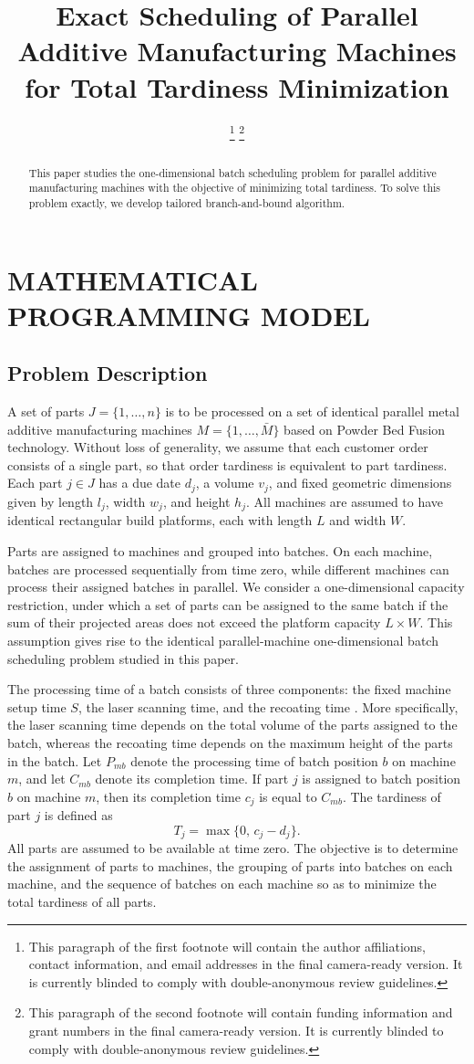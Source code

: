 \documentclass[letterpaper, 10 pt, conference]{ieeeconf}  %
\title{\LARGE \bf
Exact Scheduling of Parallel Additive Manufacturing Machines for Total Tardiness Minimization
}
\author{%
\thanks{This paragraph of the first footnote will contain the author affiliations, contact information, and email addresses in the final camera-ready version. It is currently blinded to comply with double-anonymous review guidelines.}
\thanks{This paragraph of the second footnote will contain funding information and grant numbers in the final camera-ready version. It is currently blinded to comply with double-anonymous review guidelines.}
}
\begin{document}
\maketitle
\thispagestyle{empty}
\pagestyle{empty}

\begin{abstract}
This paper studies the one-dimensional batch scheduling problem for  parallel additive manufacturing machines with the objective of minimizing total tardiness. To solve this problem exactly, we develop tailored branch-and-bound algorithm. 
\end{abstract}



\section{MATHEMATICAL PROGRAMMING MODEL}

\subsection{Problem Description}
A set of parts $J=\{1,\dots,n\}$ is to be processed on a set of identical
parallel metal additive manufacturing machines $M=\{1,\dots,\bar M\}$
based on Powder Bed Fusion technology. Without loss of generality, we assume
that each customer order consists of a single part, so that order tardiness
is equivalent to part tardiness. Each part $j \in J$ has a due date $d_j$, a
volume $v_j$, and fixed geometric dimensions given by length $l_j$, width
$w_j$, and height $h_j$. All machines are assumed to have identical
rectangular build platforms, each with length $L$ and width $W$.

Parts are assigned to machines and grouped into batches. On each machine,
batches are processed sequentially from time zero, while different machines
can process their assigned batches in parallel. We consider a
one-dimensional capacity restriction, under which a set of parts can be
assigned to the same batch if the sum of their projected areas does not
exceed the platform capacity $L \times W$. This assumption gives rise to the
identical parallel-machine one-dimensional batch scheduling problem studied
in this paper.

The processing time of a batch consists of three components: the fixed
machine setup time $S$, the laser scanning time, and the recoating time
\cite{cheMachineSchedulingOrientation2021}. More specifically, the laser
scanning time depends on the total volume of the parts assigned to the
batch, whereas the recoating time depends on the maximum height of the parts
in the batch. Let $P_{mb}$ denote the processing time of batch position $b$
on machine $m$, and let $C_{mb}$ denote its completion time. If part $j$ is
assigned to batch position $b$ on machine $m$, then its completion time
$c_j$ is equal to $C_{mb}$. The tardiness of part $j$ is defined as
\[
T_j=\max\{0,\,c_j-d_j\}.
\]
All parts are assumed to be available at time zero. The objective is to
determine the assignment of parts to machines, the grouping of parts into
batches on each machine, and the sequence of batches on each machine so as
to minimize the total tardiness of all parts.
\end{document}
